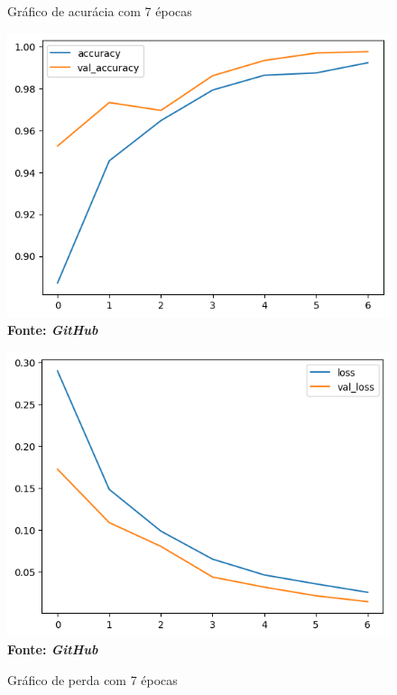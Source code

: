 \begin{figure}[ht]
\centering
\begin{minipage}{0.45\textwidth}
  \centering
  \caption[\hspace{0.1cm}Grade Computacional.]{Gráfico de acurácia com 7 épocas}
  \vspace{-0.4cm}
  \includegraphics[width=\linewidth]{figuras/accuracy_7.png}
  \captionsetup{justification=centering}
  \vspace{-0.2cm}
  \\\textbf{\footnotesize Fonte: \textit{GitHub}}
  \label{fig:acc7}
\end{minipage}\hfill
\begin{minipage}{0.45\textwidth}
  \centering
  \caption[\hspace{0.1cm}Grade Computacional.]{Gráfico de perda com 7 épocas}
  \vspace{-0.4cm}
  \includegraphics[width=\linewidth]{figuras/loss_7.png}
  \captionsetup{justification=centering}
  \vspace{-0.2cm}
  \\\textbf{\footnotesize Fonte: \textit{GitHub}}
  \label{fig:loss7}
\end{minipage}
\end{figure}




